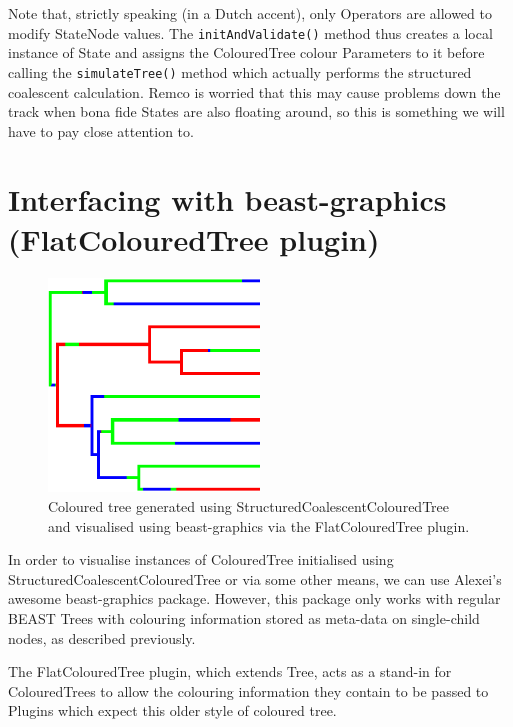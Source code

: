 \documentclass[a4paper,11pt]{paper}
\newcommand{\class}[1]{\textsf{#1}}
\newcommand{\project}[1]{\textsf{#1}}
\newcommand{\code}[1]{\texttt{#1}}
\begin{document}
Note that, strictly speaking (in a Dutch accent), only
\class{Operators} are allowed to modify \class{StateNode} values.  The
\code{initAndValidate()} method thus creates a local instance of
\class{State} and assigns the \class{ColouredTree} colour
\class{Parameters} to it before calling the \code{simulateTree()}
method which actually performs the structured coalescent calculation.
Remco is worried that this may cause problems down the track when bona
fide \class{State}s are also floating around, so this is something we
will have to pay close attention to.

\section{Interfacing with {\textsf beast-graphics} (FlatColouredTree plugin)}

\begin{figure}
	\centering
	\includegraphics[width=0.5\textwidth]{structuredCoalescentFig.pdf}
	\caption{Coloured tree generated using
		\class{StructuredCoalescentColouredTree} and visualised using
	\project{beast-graphics} via the \class{FlatColouredTree} plugin.}
	\label{fig:structuredCoalescent}
\end{figure}

In order to visualise instances of \class{ColouredTree} initialised
using \class{StructuredCoalescentColouredTree} or via some other
means, we can use Alexei's awesome \project{beast-graphics} package.
However, this package only works with regular BEAST \class{Tree}s
with colouring information stored as meta-data on single-child nodes,
as described previously.

The \class{FlatColouredTree} plugin, which extends \class{Tree}, acts
as a stand-in for \class{ColouredTree}s to allow the colouring
information they contain to be passed to \class{Plugin}s which expect
this older style of coloured tree.
\end{document}
